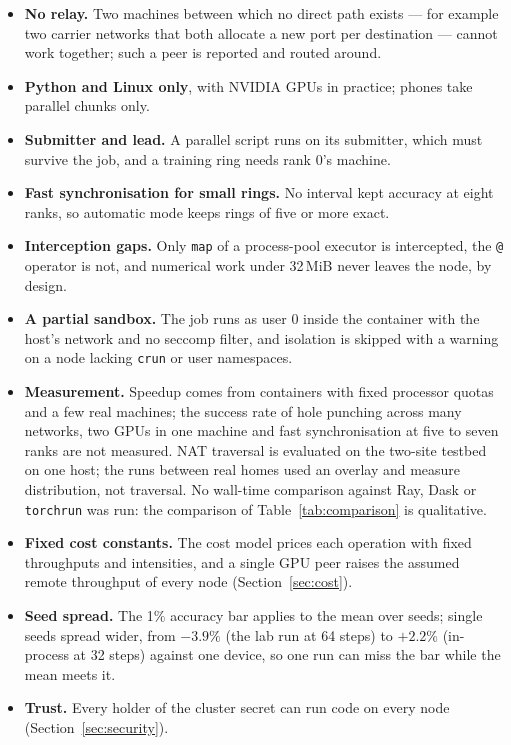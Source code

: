 \begin{itemize}[leftmargin=*]
  \item \textbf{No relay.} Two machines between which no direct path exists ---
  for example two carrier networks that both allocate a new port per
  destination --- cannot work together; such a peer is reported and routed
  around.
  \item \textbf{Python and Linux only}, with NVIDIA GPUs in practice; phones
  take parallel chunks only.
  \item \textbf{Submitter and lead.} A parallel script runs on its submitter,
  which must survive the job, and a training ring needs rank 0's machine.
  \item \textbf{Fast synchronisation for small rings.} No interval kept accuracy
  at eight ranks, so automatic mode keeps rings of five or more exact.
  \item \textbf{Interception gaps.} Only \texttt{map} of a process-pool executor
  is intercepted, the \texttt{@} operator is not, and numerical work under
  32\,MiB never leaves the node, by design.
  \item \textbf{A partial sandbox.} The job runs as user 0 inside the container
  with the host's network and no seccomp filter, and isolation is skipped with a
  warning on a node lacking \texttt{crun} or user namespaces.
  \item \textbf{Measurement.} Speedup comes from containers with fixed processor
  quotas and a few real machines; the success rate of hole punching across many networks, two
  GPUs in one machine and fast synchronisation at five to seven ranks are not
  measured. NAT traversal is evaluated on the two-site testbed on one host;
  the runs between real homes used an overlay and measure distribution, not
  traversal. No wall-time comparison against Ray, Dask or \texttt{torchrun} was
  run: the comparison of Table~\ref{tab:comparison} is qualitative.
  \item \textbf{Fixed cost constants.} The cost model prices each operation with
  fixed throughputs and intensities, and a single GPU peer raises the assumed
  remote throughput of every node (Section~\ref{sec:cost}).
  \item \textbf{Seed spread.} The 1\% accuracy bar applies to the mean over
  seeds; single seeds spread wider, from $-3.9\%$ (the lab run at 64 steps) to
  $+2.2\%$ (in-process at 32 steps) against one device, so one run can miss the
  bar while the mean meets it.
  \item \textbf{Trust.} Every holder of the cluster secret can run code on every
  node (Section~\ref{sec:security}).
\end{itemize}
